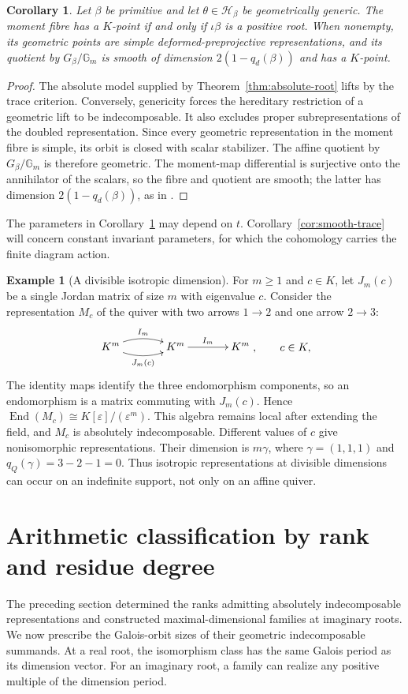 \documentclass[11pt, reqno]{amsart}
\numberwithin{equation}{section}
\newtheorem{corollary}[theorem]{Corollary}
\theoremstyle{definition}
\newtheorem{example}[theorem]{Example}
\theoremstyle{remark}
\newcommand{\op}[1]{\operatorname{#1}}
\newcommand{\mb}[1]{\mathbb{#1}}
\newcommand{\mc}[1]{\mathcal{#1}}
\newcommand{\End}{\op{End}}
\newcommand{\iso}{\cong}
\newcommand{\quiverdiagram}[1]{\vcenter{\hbox{$\displaystyle #1$}}}
\begin{document}
\begin{corollary}\label{cor:full-generic-moduli}
Let $\beta$ be primitive and let $\theta\in \mc H_\beta$ be
geometrically generic. The moment fibre has a $K$-point if and
only if $\iota\beta$ is a positive root. When nonempty, its
geometric points are simple deformed-preprojective representations,
and its quotient by $G_\beta/\mb G_m$ is smooth of dimension
$2(1-q_d(\beta))$ and has a $K$-point.
\end{corollary}
\begin{proof}
The absolute model supplied by Theorem~\ref{thm:absolute-root}
lifts by the trace criterion. Conversely, genericity forces the
hereditary restriction of a geometric lift to be indecomposable.
It also excludes proper subrepresentations of the doubled
representation. Since every geometric representation in the moment fibre is simple,
its orbit is closed with scalar stabilizer. The affine quotient by
$G_\beta/\mb G_m$ is therefore geometric. The moment-map differential
is surjective onto the annihilator of the scalars, so the fibre and
quotient are smooth; the latter has dimension $2(1-q_d(\beta))$,
as in \cite[Section~2.1]{CBVdB}.
\end{proof}

The parameters in Corollary~\ref{cor:full-generic-moduli} may depend
on $t$. Corollary~\ref{cor:smooth-trace} will concern constant invariant
parameters, for which the cohomology carries the finite diagram action.

\begin{example}[A divisible isotropic dimension]\label{ex:divisible-isotropic}
For $m\ge1$ and $c\in K$, let $J_m(c)$ be a single Jordan matrix
of size $m$ with eigenvalue $c$. Consider the representation $M_c$
of the quiver with two arrows $1\to2$ and one arrow $2\to3$:
\[
\quiverdiagram{\xymatrix@C=3.6em{K^m\ar@/^0.65pc/[r]^{I_m}\ar@/_0.65pc/[r]_{J_m(c)}&K^m\ar[r]^{I_m}&K^m}},\qquad c\in K,\]
The identity maps identify the three endomorphism components, so
an endomorphism is a matrix commuting with $J_m(c)$. Hence
$\End(M_c)\iso K[\varepsilon]/(\varepsilon^m)$.
This algebra remains local after extending the field, and $M_c$ is
absolutely indecomposable. Different values of $c$ give nonisomorphic
representations. Their dimension is $m\gamma$, where
$\gamma=(1,1,1)$ and $q_Q(\gamma)=3-2-1=0$. Thus isotropic
representations at divisible dimensions can occur on an indefinite
support, not only on an affine quiver.
\end{example}

\section{Arithmetic classification by rank and residue degree}
\label{sec:classification}
The preceding section determined the ranks admitting absolutely
indecomposable representations and constructed maximal-dimensional
families at imaginary roots. We now prescribe the Galois-orbit sizes
of their geometric indecomposable summands. At a real root, the isomorphism class has the
same Galois period as its dimension vector. For an imaginary root,
a family can realize any positive multiple of the dimension period.
\end{document}
